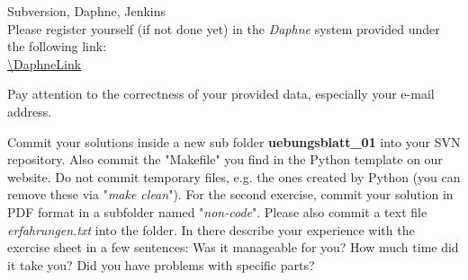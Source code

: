  Subversion, Daphne, Jenkins \\
Please register yourself (if not done yet) in the \textit{Daphne} system provided under the following
link:\\
\url{\DaphneLink}

Pay attention to the correctness of your provided data, especially your e-mail
address.

Commit your solutions inside a new sub folder
\textbf{uebungsblatt\_01} into your SVN repository. Also commit the "Makefile" you find in the Python template on our website. Do not commit temporary files, e.g. the ones created by Python (you can remove these via "\textit{make clean}").
For the second exercise, commit your solution in PDF format in a subfolder named "\textit{non-code}".
Please also commit a text file \textit{erfahrungen.txt} into the folder. In there describe your experience with the exercise sheet in a few sentences:
Was it manageable for you?
How much time did it take you?
Did you have problems with specific parts?
